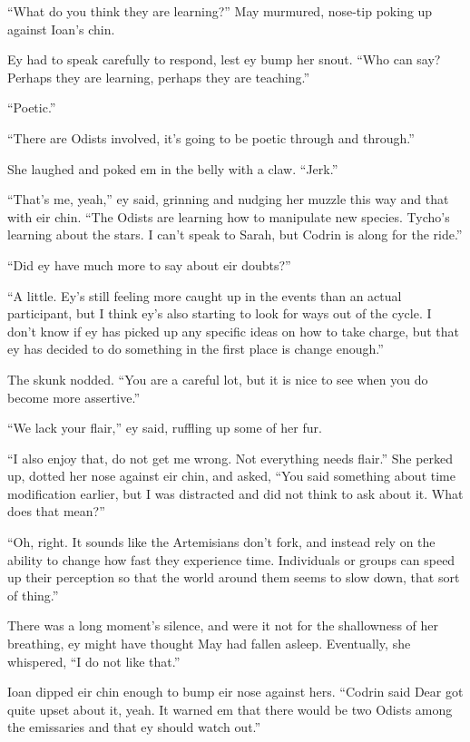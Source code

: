 ``What do you think they are learning?'' May murmured, nose-tip poking up against Ioan's chin.

Ey had to speak carefully to respond, lest ey bump her snout. ``Who can say? Perhaps they are learning, perhaps they are teaching.''

``Poetic.''

``There are Odists involved, it's going to be poetic through and through.''

She laughed and poked em in the belly with a claw. ``Jerk.''

``That's me, yeah,'' ey said, grinning and nudging her muzzle this way and that with eir chin. ``The Odists are learning how to manipulate new species. Tycho's learning about the stars. I can't speak to Sarah, but Codrin is along for the ride.''

``Did ey have much more to say about eir doubts?''

``A little. Ey's still feeling more caught up in the events than an actual participant, but I think ey's also starting to look for ways out of the cycle. I don't know if ey has picked up any specific ideas on how to take charge, but that ey has decided to do something in the first place is change enough.''

The skunk nodded. ``You are a careful lot, but it is nice to see when you do become more assertive.''

``We lack your flair,'' ey said, ruffling up some of her fur.

``I also enjoy that, do not get me wrong. Not everything needs flair.'' She perked up, dotted her nose against eir chin, and asked, ``You said something about time modification earlier, but I was distracted and did not think to ask about it. What does that mean?''

``Oh, right. It sounds like the Artemisians don't fork, and instead rely on the ability to change how fast they experience time. Individuals or groups can speed up their perception so that the world around them seems to slow down, that sort of thing.''

There was a long moment's silence, and were it not for the shallowness of her breathing, ey might have thought May had fallen asleep. Eventually, she whispered, ``I do not like that.''

Ioan dipped eir chin enough to bump eir nose against hers. ``Codrin said Dear got quite upset about it, yeah. It warned em that there would be two Odists among the emissaries and that ey should watch out.''

